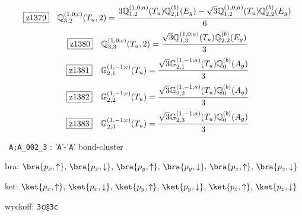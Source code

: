 \documentclass[fleqn,10pt,landscape]{jsarticle}
\begin{document}
\begin{dmath*}
\hspace*{3mm}\fbox{z1379}\quad \mathbb{Q}_{3,2}^{(1,0;c)}(T_{u},2)=\frac{3 \mathbb{Q}_{1,2}^{(1,0;a)}(T_{u}) \mathbb{Q}_{2,1}^{(b)}(E_{g}) - \sqrt{3} \mathbb{Q}_{1,2}^{(1,0;a)}(T_{u}) \mathbb{Q}_{2,2}^{(b)}(E_{g})}{6}
\end{dmath*}
\begin{dmath*}
\hspace*{3mm}\fbox{z1380}\quad \mathbb{Q}_{3,3}^{(1,0;c)}(T_{u},2)=\frac{\sqrt{3} \mathbb{Q}_{1,3}^{(1,0;a)}(T_{u}) \mathbb{Q}_{2,2}^{(b)}(E_{g})}{3}
\end{dmath*}
\begin{dmath*}
\hspace*{3mm}\fbox{z1381}\quad \mathbb{G}_{2,1}^{(1,-1;c)}(T_{u})=\frac{\sqrt{3} \mathbb{G}_{2,1}^{(1,-1;a)}(T_{u}) \mathbb{Q}_{0}^{(b)}(A_{g})}{3}
\end{dmath*}
\begin{dmath*}
\hspace*{3mm}\fbox{z1382}\quad \mathbb{G}_{2,2}^{(1,-1;c)}(T_{u})=\frac{\sqrt{3} \mathbb{G}_{2,2}^{(1,-1;a)}(T_{u}) \mathbb{Q}_{0}^{(b)}(A_{g})}{3}
\end{dmath*}
\begin{dmath*}
\hspace*{3mm}\fbox{z1383}\quad \mathbb{G}_{2,3}^{(1,-1;c)}(T_{u})=\frac{\sqrt{3} \mathbb{G}_{2,3}^{(1,-1;a)}(T_{u}) \mathbb{Q}_{0}^{(b)}(A_{g})}{3}
\end{dmath*}
\vspace{5mm}

\noindent\textbullet\, \texttt{A;A_002_3} : '\texttt{A}'-'\texttt{A}' bond-cluster

\noindent\quad * bra: $\bra{p_{x},\uparrow},\, \bra{p_{x},\downarrow},\, \bra{p_{y},\uparrow},\, \bra{p_{y},\downarrow},\, \bra{p_{z},\uparrow},\, \bra{p_{z},\downarrow}$

\noindent\quad * ket: $\ket{p_{x},\uparrow},\, \ket{p_{x},\downarrow},\, \ket{p_{y},\uparrow},\, \ket{p_{y},\downarrow},\, \ket{p_{z},\uparrow},\, \ket{p_{z},\downarrow}$

\noindent\quad * wyckoff: \texttt{3c@3c}
\end{document}
